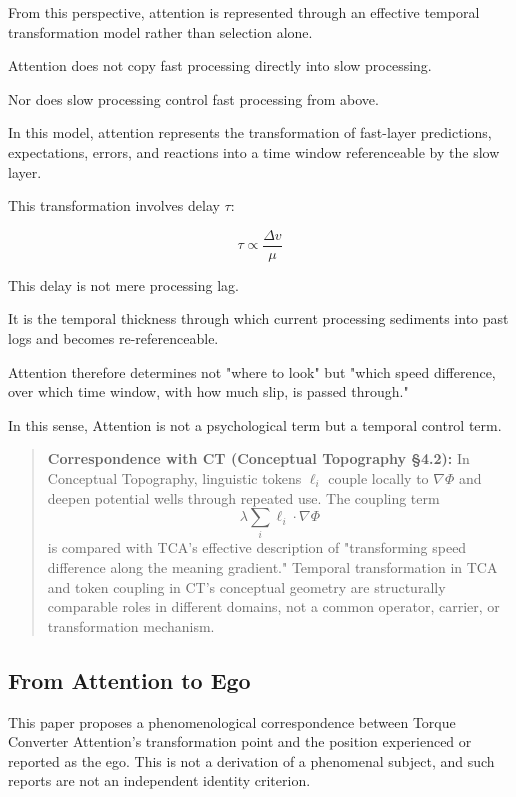 From this perspective, attention is represented through an effective temporal transformation model rather than selection alone.

Attention does not copy fast processing directly into slow processing.

Nor does slow processing control fast processing from above.

In this model, attention represents the transformation of fast-layer predictions, expectations, errors, and reactions into a time window referenceable by the slow layer.

This transformation involves delay $\tau$:

\begin{equation}
\tau \propto \frac{\Delta v}{\mu}
\end{equation}

This delay is not mere processing lag.

It is the temporal thickness through which current processing sediments into past logs and becomes re-referenceable.

Attention therefore determines not "where to look" but "which speed difference, over which time window, with how much slip, is passed through."

In this sense, Attention is not a psychological term but a temporal control term.

\begin{quote}
\textbf{Correspondence with CT (Conceptual Topography §4.2):} In Conceptual Topography, linguistic tokens $\ell_i$ couple locally to $\nabla\Phi$ and deepen potential wells through repeated use. The coupling term
\[
\lambda \sum_i \ell_i \cdot \nabla\Phi
\]
is compared with TCA's effective description of "transforming speed difference along the meaning gradient." Temporal transformation in TCA and token coupling in CT's conceptual geometry are structurally comparable roles in different domains, not a common operator, carrier, or transformation mechanism.
\end{quote}

\subsection{From Attention to Ego}


This paper proposes a phenomenological correspondence between Torque Converter Attention's transformation point and the position experienced or reported as the ego. This is not a derivation of a phenomenal subject, and such reports are not an independent identity criterion.

